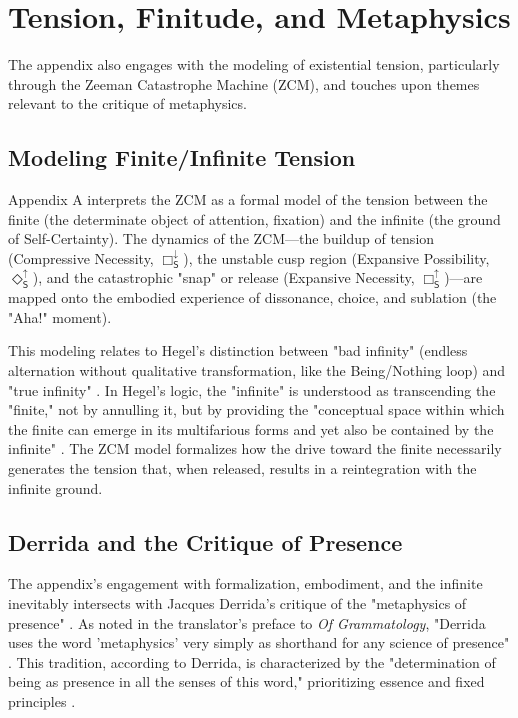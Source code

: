 \documentclass[12pt]{book}
\newcommand{\SBoxUp}{\Box_{\mathsf{S}}^{\uparrow}}
\newcommand{\SBoxDown}{\Box_{\mathsf{S}}^{\downarrow}}
\newcommand{\SDiaUp}{\Diamond_{\mathsf{S}}^{\uparrow}}
\begin{document}
\section{Tension, Finitude, and Metaphysics}

The appendix also engages with the modeling of existential tension, particularly through the Zeeman Catastrophe Machine (ZCM), and touches upon themes relevant to the critique of metaphysics.

\subsection{Modeling Finite/Infinite Tension}

Appendix A interprets the ZCM as a formal model of the tension between the finite (the determinate object of attention, fixation) and the infinite (the ground of Self-Certainty). The dynamics of the ZCM—the buildup of tension (Compressive Necessity, $\SBoxDown$), the unstable cusp region (Expansive Possibility, $\SDiaUp$), and the catastrophic "snap" or release (Expansive Necessity, $\SBoxUp$)—are mapped onto the embodied experience of dissonance, choice, and sublation (the "Aha!" moment).

This modeling relates to Hegel's distinction between "bad infinity" (endless alternation without qualitative transformation, like the Being/Nothing loop) and "true infinity" \parencite{inwood1992hegel}. In Hegel's logic, the "infinite" is understood as transcending the "finite," not by annulling it, but by providing the "conceptual space within which the finite can emerge in its multifarious forms and yet also be contained by the infinite" \parencite[p. xxi]{Hegel:2014aa}. The ZCM model formalizes how the drive toward the finite necessarily generates the tension that, when released, results in a reintegration with the infinite ground.

\subsection{Derrida and the Critique of Presence}

The appendix's engagement with formalization, embodiment, and the infinite inevitably intersects with Jacques Derrida's critique of the "metaphysics of presence" \parencite{Derrida2011}. As noted in the translator's preface to \textit{Of Grammatology}, "Derrida uses the word 'metaphysics' very simply as shorthand for any science of presence" \parencite[p. xxi]{Derrida1997}. This tradition, according to Derrida, is characterized by the "determination of being as presence in all the senses of this word," prioritizing essence and fixed principles \parencite[p. xxi, quoting Derrida]{Derrida1997}.
\end{document}
